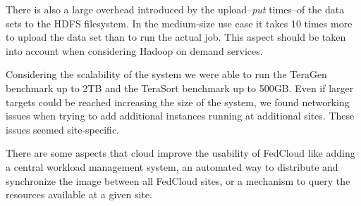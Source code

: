 

There is also a large overhead introduced by the upload--\emph{put} times--of the data sets to the HDFS filesystem. In the medium-size use case it takes 10 times more to upload the data set than to run the actual job. This aspect should be taken into account when considering Hadoop on demand services.

Considering the scalability of the system we were able to run the TeraGen benchmark up to 2TB and the TeraSort benchmark up to 500GB. Even if larger targets could be reached increasing the size of the system, we found networking issues when trying to add additional instances running at additional sites. These issues seemed site-specific.

There are some aspects that cloud improve the usability of FedCloud like adding a central workload management system, an automated way to distribute and synchronize the image between all FedCloud sites, or a mechanism to query the resources available at a given site.





